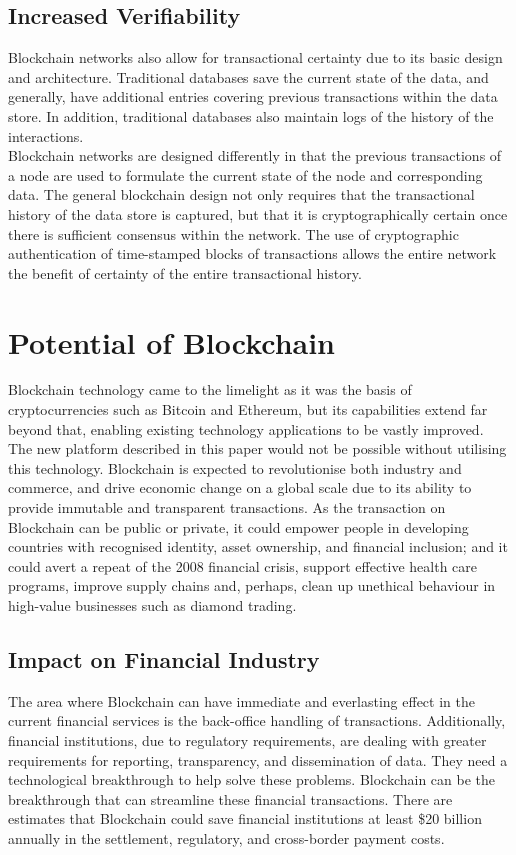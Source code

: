 \subsection{Increased Verifiability}
Blockchain networks also allow for transactional certainty due to its basic design and architecture. Traditional databases save the current state of the data, and generally, have additional entries covering previous transactions within the data store. In addition, traditional databases also maintain logs of the history of the interactions.
\\Blockchain networks are designed differently in that the previous transactions of a node are used to formulate the current state of the node and corresponding data. The general blockchain design not only requires that the transactional history of the data store is captured, but that it is cryptographically certain once there is sufficient consensus within the network. The use of cryptographic authentication of time-stamped blocks of transactions allows the entire network the benefit of certainty of the entire transactional history.

\section{Potential of Blockchain}
Blockchain technology came to the limelight as it was the basis of cryptocurrencies such as Bitcoin and Ethereum, but its capabilities extend far beyond that, enabling existing technology applications to be vastly improved. The new platform described in this paper would not be possible without utilising this technology. Blockchain is expected to revolutionise both industry and commerce, and drive economic change on a global scale due to its ability to provide immutable and transparent transactions.  As the transaction on Blockchain can be public or private, it could empower people in developing countries with recognised identity, asset ownership, and financial inclusion; and it could avert a repeat of the 2008 financial crisis, support effective health care programs, improve supply chains and, perhaps, clean up unethical behaviour in high-value businesses such as diamond trading.\cite{Underwood2016BlockchainBitcoin}

\subsection{Impact on Financial Industry}
The area where Blockchain can have immediate and everlasting effect in the current financial services is the back-office handling of transactions. Additionally, financial institutions, due to regulatory requirements, are dealing with greater requirements for reporting, transparency, and dissemination of data. They need a technological breakthrough to help solve these problems. Blockchain can be the breakthrough that can streamline these financial transactions. There are estimates that Blockchain could save financial institutions at least \$20 billion annually in the settlement, regulatory, and cross-border payment costs.\cite{Fanning2016BlockchainServices}

